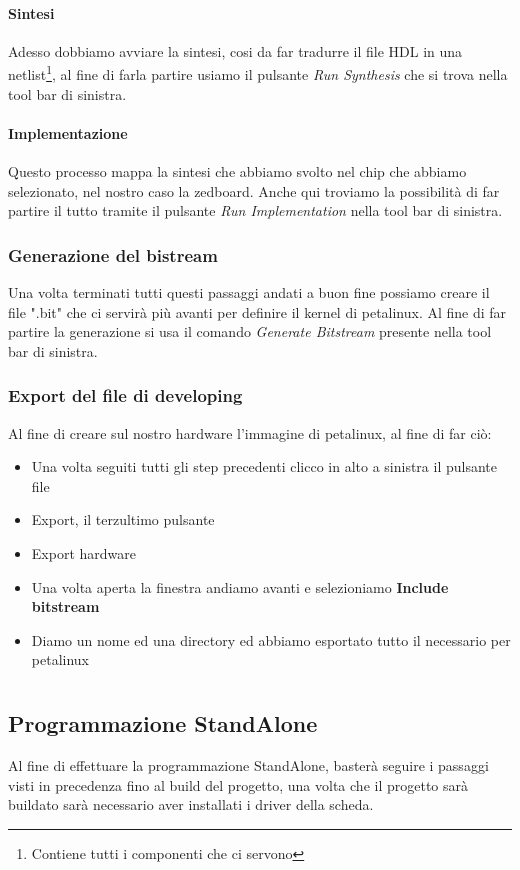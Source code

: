 \subsubsection{Sintesi}
Adesso dobbiamo avviare la sintesi, cosi da far tradurre il file HDL in una netlist\footnote{Contiene tutti i componenti che ci servono}, al fine di farla partire usiamo il pulsante \textit{Run Synthesis} che si trova nella tool bar di sinistra.
\subsubsection{Implementazione}
Questo processo mappa la sintesi che abbiamo svolto nel chip che abbiamo selezionato, nel nostro caso la zedboard. Anche qui troviamo la possibilità di far partire il tutto tramite il pulsante \textit{Run Implementation} nella tool bar di sinistra.
\subsection{Generazione del bistream}
Una volta terminati tutti questi passaggi andati a buon fine possiamo creare il file ".bit" che ci servirà più avanti per definire il kernel di petalinux. Al fine di far partire la generazione si usa il comando \textit{Generate Bitstream} presente nella tool bar di sinistra.
\subsection{Export del file di developing}\label{ExportVivado}
Al fine di creare sul nostro hardware l'immagine di petalinux, al fine di far ciò:
\begin{itemize}
\item Una volta seguiti tutti gli step precedenti clicco in alto a sinistra il pulsante file
\item Export, il terzultimo pulsante
\item Export hardware
\item Una volta aperta la finestra andiamo avanti e selezioniamo \textbf{Include bitstream}
\item Diamo un nome ed una directory ed abbiamo esportato tutto il necessario per petalinux
\end{itemize}


\chapter{}

\section{Programmazione StandAlone}
\label{Standalone}
Al fine di effettuare la programmazione StandAlone, basterà seguire i passaggi visti in precedenza fino al build del progetto, una volta che il progetto sarà buildato sarà necessario aver installati i driver della scheda.
